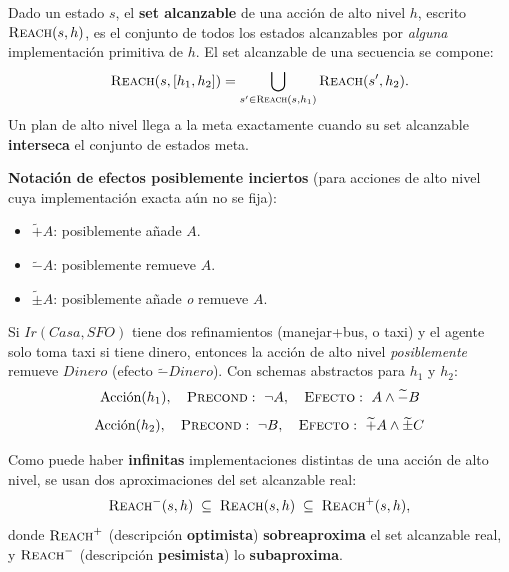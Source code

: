 \begin{definition}
Dado un estado $s$, el \textbf{set alcanzable} de una acción de alto nivel $h$, escrito
$\textsc{Reach}(s,h)$, es el conjunto de todos los estados alcanzables por \emph{alguna}
implementación primitiva de $h$. El set alcanzable de una secuencia se compone:
\[
    \textsc{Reach}(s,[h_1,h_2]) = \bigcup_{s' \in \textsc{Reach}(s,h_1)} \textsc{Reach}(s',h_2).
\]
Un plan de alto nivel llega a la meta exactamente cuando su set alcanzable \textbf{interseca} el
conjunto de estados meta.
\end{definition}

\textbf{Notación de efectos posiblemente inciertos} (para acciones de alto nivel cuya implementación
exacta aún no se fija):
\begin{itemize}
    \item $\widetilde{+}A$: posiblemente añade $A$.
    \item $\widetilde{-}A$: posiblemente remueve $A$.
    \item $\widetilde{\pm}A$: posiblemente añade \emph{o} remueve $A$.
\end{itemize}

\begin{example}
Si $Ir(Casa,SFO)$ tiene dos refinamientos (manejar+bus, o taxi) y el agente solo toma taxi si tiene
dinero, entonces la acción de alto nivel \emph{posiblemente} remueve $Dinero$ (efecto
$\widetilde{-}Dinero$). Con schemas abstractos para $h_1$ y $h_2$:
\[
    \text{Acci\'on}(h_1),\quad \textsc{Precond}:\ \neg A,\quad \textsc{Efecto}:\ A\land
    \widetilde{-}B
\]
\[
    \text{Acci\'on}(h_2),\quad \textsc{Precond}:\ \neg B,\quad \textsc{Efecto}:\ \widetilde{+}A\land
    \widetilde{\pm}C
\]
\end{example}

Como puede haber \textbf{infinitas} implementaciones distintas de una acción de alto nivel, se usan
dos aproximaciones del set alcanzable real:
\[
    \textsc{Reach}^-(s,h) \;\subseteq\; \textsc{Reach}(s,h) \;\subseteq\; \textsc{Reach}^+(s,h),
\]
donde $\textsc{Reach}^+$ (descripción \textbf{optimista}) \textbf{sobreaproxima} el set alcanzable
real, y $\textsc{Reach}^-$ (descripción \textbf{pesimista}) lo \textbf{subaproxima}.


